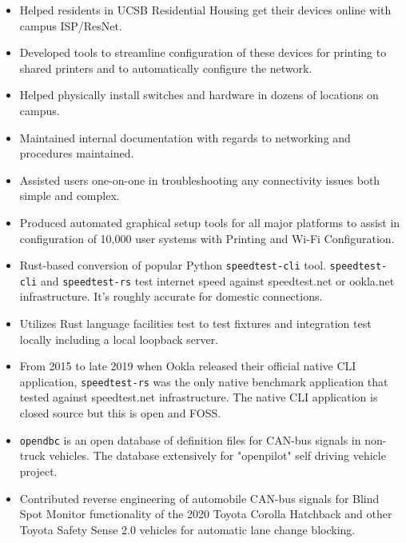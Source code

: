 \documentclass[10pt,letter,ragged2e]{altacv}
\begin{document}
\begin{paracol}{2}
\begin{itemize}
\item Helped residents in UCSB Residential Housing get their devices online with campus ISP/ResNet. 
\item Developed tools to streamline configuration of these devices for
printing to shared printers and to automatically configure the network. \item Helped physically install switches and hardware in dozens of locations on campus.
\item Maintained internal documentation with regards to networking and procedures maintained. 
\item Assisted users one-on-one in troubleshooting any connectivity
issues both simple and complex. 
\item Produced automated graphical setup tools for all major platforms to assist in configuration of 10,000 user systems with
Printing and Wi-Fi Configuration.
\end{itemize}



\begin{itemize}
\item Rust-based conversion of popular Python \texttt{speedtest-cli} tool. \texttt{speedtest-cli} and \texttt{speedtest-rs} test internet speed against speedtest.net or ookla.net infrastructure. It's roughly accurate for domestic connections.
\item Utilizes Rust language facilities test to test fixtures and integration test locally including a local loopback server.
\item From 2015 to late 2019 when Ookla released their official native CLI application, \texttt{speedtest-rs} was the only native benchmark application that tested against speedtest.net infrastructure. The native CLI application is closed source but this is open and FOSS.
\end{itemize}

\divider


\begin{itemize}
\item \texttt{opendbc} is an open database of definition files for CAN-bus signals in non-truck vehicles. The database extensively for "openpilot" self driving vehicle project.
\item Contributed reverse engineering of automobile CAN-bus signals for Blind Spot Monitor functionality of the 2020 Toyota Corolla Hatchback and other Toyota Safety Sense 2.0 vehicles for automatic lane change blocking.
\end{itemize}




\end{paracol}
\end{document}
